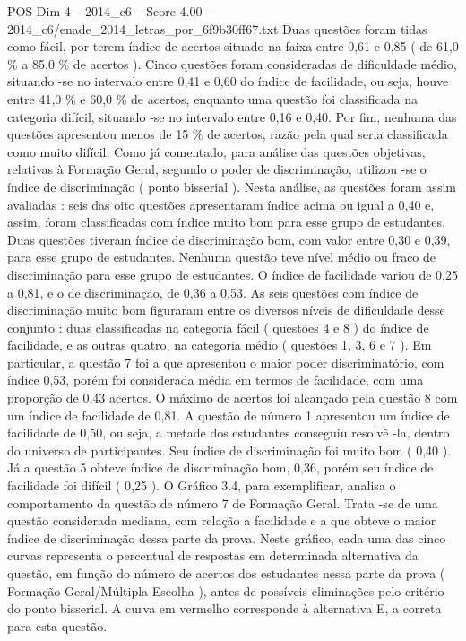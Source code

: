 \begin{textsample}{POS Dim 4 – 2014\_c6 – Score 4.00 – 2014\_c6/enade\_2014\_letras\_por\_6f9b30ff67.txt}
Duas questões foram tidas como fácil, por terem índice de acertos situado na faixa entre 0,61 e 0,85 ( de 61,0 \% a 85,0 \% de acertos ).
Cinco questões foram consideradas de dificuldade médio, situando -se no intervalo entre 0,41 e 0,60 do índice de facilidade, ou seja, houve entre 41,0 \% e 60,0 \% de acertos, enquanto uma questão foi classificada na categoria difícil, situando -se no intervalo entre 0,16 e 0,40.
Por fim, nenhuma das questões apresentou menos de 15 \% de acertos, razão pela qual seria classificada como muito difícil.
Como já comentado, para análise das questões objetivas, relativas à Formação Geral, segundo o poder de discriminação, utilizou -se o índice de discriminação ( ponto bisserial ).
Nesta análise, as questões foram assim avaliadas : seis das oito questões apresentaram índice acima ou igual a 0,40 e, assim, foram classificadas com índice muito bom para esse grupo de estudantes.
Duas questões tiveram índice de discriminação bom, com valor entre 0,30 e 0,39, para esse grupo de estudantes.
Nenhuma questão teve nível médio ou fraco de discriminação para esse grupo de estudantes.
O índice de facilidade variou de 0,25 a 0,81, e o de discriminação, de 0,36 a 0,53.
As seis questões com índice de discriminação muito bom figuraram entre os diversos níveis de dificuldade desse conjunto : duas classificadas na categoria fácil ( questões 4 e 8 ) do índice de facilidade, e as outras quatro, na categoria médio ( questões 1, 3, 6 e 7 ).
Em particular, a questão 7 foi a que apresentou o maior poder discriminatório, com índice 0,53, porém foi considerada média em termos de facilidade, com uma proporção de 0,43 acertos.
O máximo de acertos foi alcançado pela questão 8 com um índice de facilidade de 0,81.
A questão de número 1 apresentou um índice de facilidade de 0,50, ou seja, a metade dos estudantes conseguiu resolvê -la, dentro do universo de participantes.
Seu índice de discriminação foi muito bom ( 0,40 ).
Já a questão 5 obteve índice de discriminação bom, 0,36, porém seu índice de facilidade foi difícil ( 0,25 ).
O Gráfico 3.4, para exemplificar, analisa o comportamento da questão de número 7 de Formação Geral.
Trata -se de uma questão considerada mediana, com relação a facilidade e a que obteve o maior índice de discriminação dessa parte da prova.
Neste gráfico, cada uma das cinco curvas representa o percentual de respostas em determinada alternativa da questão, em função do número de acertos dos estudantes nessa parte da prova ( Formação Geral/Múltipla Escolha ), antes de possíveis eliminações pelo critério do ponto bisserial.
A curva em vermelho corresponde à alternativa E, a correta para esta questão.

\end{textsample}
